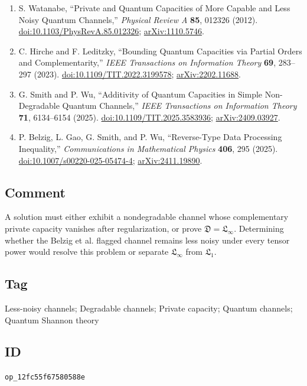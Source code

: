 \begin{enumerate}[label={},leftmargin=4.8em,labelsep=0.5em]
  \footnotesize
  \item[\textup{[Wat12]}]\label{ref:p52-watanabe}
  S. Watanabe, ``Private and Quantum Capacities of More Capable and Less Noisy
  Quantum Channels,'' \emph{Physical Review A} \textbf{85}, 012326 (2012).
  \href{https://doi.org/10.1103/PhysRevA.85.012326}%
       {doi:10.1103/PhysRevA.85.012326};
  \href{https://arxiv.org/abs/1110.5746}{arXiv:1110.5746}.

  \item[\textup{[HL23]}]\label{ref:p52-hirche-leditzky}
  C. Hirche and F. Leditzky,
  ``Bounding Quantum Capacities via Partial Orders and Complementarity,''
  \emph{IEEE Transactions on Information Theory} \textbf{69}, 283--297
  (2023). \href{https://doi.org/10.1109/TIT.2022.3199578}%
       {doi:10.1109/TIT.2022.3199578};
  \href{https://arxiv.org/abs/2202.11688}{arXiv:2202.11688}.

  \item[\textup{[SW25]}]\label{ref:p52-smith-wu}
  G. Smith and P. Wu,
  ``Additivity of Quantum Capacities in Simple Non-Degradable Quantum
  Channels,'' \emph{IEEE Transactions on Information Theory} \textbf{71},
  6134--6154 (2025).
  \href{https://doi.org/10.1109/TIT.2025.3583936}%
       {doi:10.1109/TIT.2025.3583936};
  \href{https://arxiv.org/abs/2409.03927}{arXiv:2409.03927}.

  \item[\textup{[BGSW25]}]\label{ref:p52-belzig-et-al}
  P. Belzig, L. Gao, G. Smith, and P. Wu,
  ``Reverse-Type Data Processing Inequality,''
  \emph{Communications in Mathematical Physics} \textbf{406}, 295 (2025).
  \href{https://doi.org/10.1007/s00220-025-05474-4}%
       {doi:10.1007/s00220-025-05474-4};
  \href{https://arxiv.org/abs/2411.19890}{arXiv:2411.19890}.
\end{enumerate}

\subsection*{Comment}

A solution must either exhibit a nondegradable channel whose complementary
private capacity vanishes after regularization, or prove
$\mathfrak D=\mathfrak L_\infty$.  Determining whether the Belzig et al.
flagged channel remains less noisy under every tensor power would resolve this
problem or separate $\mathfrak L_\infty$ from $\mathfrak L_1$.

\subsection*{Tag}

Less-noisy channels; Degradable channels; Private capacity; Quantum channels;
Quantum Shannon theory

\subsection*{ID}

\texttt{op\_12fc55f67580588e}
